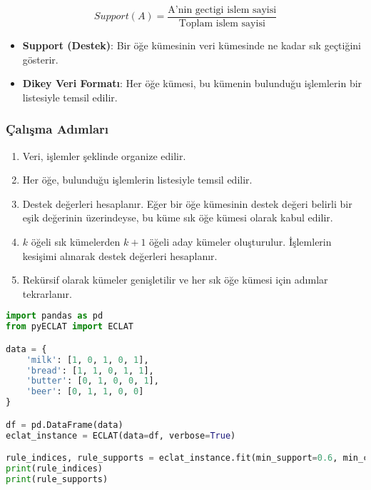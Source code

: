 \[ Support(A) = \frac{\text{A'nin gectigi islem sayisi}}{\text{Toplam islem sayisi}} \]

\begin{itemize}
	\item \textbf{Support (Destek)}: Bir öğe kümesinin veri kümesinde ne kadar sık geçtiğini gösterir.
	\item \textbf{Dikey Veri Formatı}: Her öğe kümesi, bu kümenin bulunduğu işlemlerin bir listesiyle temsil edilir.
\end{itemize}

\subsubsection{Çalışma Adımları}

\begin{enumerate}
	\item Veri, işlemler şeklinde organize edilir.
	\item Her öğe, bulunduğu işlemlerin listesiyle temsil edilir.
	\item Destek değerleri hesaplanır. Eğer bir öğe kümesinin destek değeri belirli bir eşik değerinin üzerindeyse, bu küme sık öğe kümesi olarak kabul edilir.
	\item $k$ öğeli sık kümelerden $k+1$ öğeli aday kümeler oluşturulur. İşlemlerin kesişimi alınarak destek değerleri hesaplanır.
	\item Rekürsif olarak kümeler genişletilir ve her sık öğe kümesi için adımlar tekrarlanır.
\end{enumerate}

\begin{lstlisting}[language=Python]
import pandas as pd
from pyECLAT import ECLAT

data = {
    'milk': [1, 0, 1, 0, 1],
    'bread': [1, 1, 0, 1, 1],
    'butter': [0, 1, 0, 0, 1],
    'beer': [0, 1, 1, 0, 0]
}

df = pd.DataFrame(data)
eclat_instance = ECLAT(data=df, verbose=True)

rule_indices, rule_supports = eclat_instance.fit(min_support=0.6, min_combination=1, max_combination=3)
print(rule_indices)
print(rule_supports)
\end{lstlisting}

\newpage